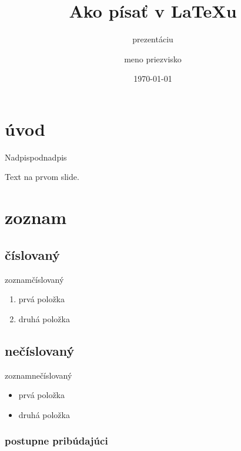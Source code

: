 \documentclass{beamer}
\title{Ako písať v \LaTeX u}
\subtitle{prezentáciu}
\author{meno priezvisko}
\institute[STU] %
{
  vedúci práce \\
  odbor/pracovisko/škola
}
\date{\today}
\begin{document}
\begin{frame}
\titlepage
\end{frame}


\section{úvod}

\begin{frame}{Nadpis}{podnadpis}
\begin{center}
Text na prvom slide.
\end{center}
\end{frame}

\section{zoznam}

\subsection{číslovaný}
\begin{frame}{zoznam}{číslovaný}
\begin{enumerate}
    \item prvá položka
    \item druhá položka
\end{enumerate}
\end{frame}

\subsection{nečíslovaný}

\begin{frame}{zoznam}{nečíslovaný}
\begin{itemize}
    \item prvá položka
    \item druhá položka
\end{itemize}
\end{frame}

\subsubsection{postupne pribúdajúci}
\end{document}
